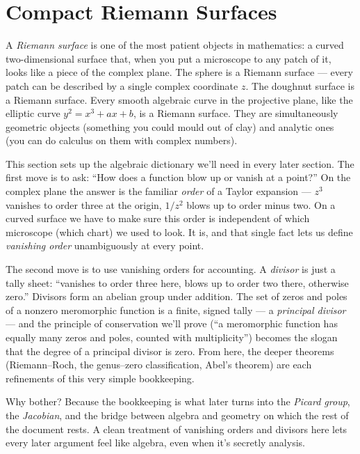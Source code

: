 \section{Compact Riemann Surfaces}
\label{sec:compact-riemann-surfaces}

\begin{layman}
A \emph{Riemann surface} is one of the most patient objects in
mathematics: a curved two-dimensional surface that, when you put a
microscope to any patch of it, looks like a piece of the complex
plane. The sphere is a Riemann surface --- every patch can be
described by a single complex coordinate \(z\). The doughnut surface
is a Riemann surface. Every smooth algebraic curve in the projective
plane, like the elliptic curve \(y^2 = x^3 + ax + b\), is a Riemann
surface. They are simultaneously geometric objects (something you
could mould out of clay) and analytic ones (you can do calculus on
them with complex numbers).

This section sets up the algebraic dictionary we'll need in every
later section. The first move is to ask: ``How does a function blow
up or vanish at a point?'' On the complex plane the answer is the
familiar \emph{order} of a Taylor expansion --- \(z^3\) vanishes to
order three at the origin, \(1/z^2\) blows up to order minus two.
On a curved surface we have to make sure this order is independent
of which microscope (which chart) we used to look. It is, and that
single fact lets us define \emph{vanishing order} unambiguously at
every point.

The second move is to use vanishing orders for accounting. A
\emph{divisor} is just a tally sheet: ``vanishes to order three
here, blows up to order two there, otherwise zero.'' Divisors form
an abelian group under addition. The set of zeros and poles of a
nonzero meromorphic function is a finite, signed tally --- a
\emph{principal divisor} --- and the principle of conservation we'll
prove (``a meromorphic function has equally many zeros and poles,
counted with multiplicity'') becomes the slogan that the degree of a
principal divisor is zero. From here, the deeper theorems
(Riemann--Roch, the genus--zero classification, Abel's theorem) are
each refinements of this very simple bookkeeping.

Why bother? Because the bookkeeping is what later turns into the
\emph{Picard group}, the \emph{Jacobian}, and the bridge between
algebra and geometry on which the rest of the document rests. A
clean treatment of vanishing orders and divisors here lets every
later argument feel like algebra, even when it's secretly analysis.
\end{layman}

